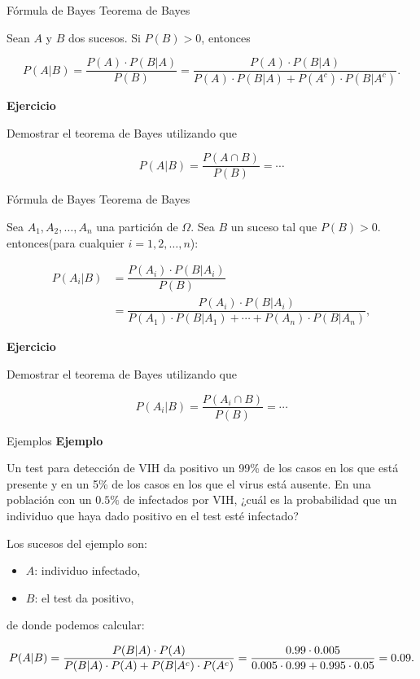 \documentclass[
  ignorenonframetext,
  aspectratio=169]{beamer}
\providecommand{\tightlist}{%
  \setlength{\itemsep}{0pt}\setlength{\parskip}{0pt}}\usepackage{longtable,booktabs,array}
\begin{document}
\begin{frame}{Fórmula de Bayes}
\label{fuxf3rmula-de-bayes}
Teorema de Bayes

Sean \(A\) y \(B\) dos sucesos. Si \(P(B)>0\), entonces

\[
P(A|B) =\dfrac{P(A)\cdot P(B|A)}{P(B)}=\dfrac{P(A)\cdot P(B|A)}{P(A)\cdot P(B|A)+P(A^c)\cdot P(B|A^c)}.
\]

\textbf{Ejercicio}

Demostrar el teorema de Bayes utilizando que

\[P(A|B) =\dfrac{P(A\cap B)}{P(B)}=\cdots\]
\end{frame}

\begin{frame}{Fórmula de Bayes}
\label{fuxf3rmula-de-bayes-1}
Teorema de Bayes

Sea \(A_1,A_2,\ldots,A_n\) una partición de \(\Omega\). Sea \(B\) un
suceso tal que \(P(B)>0\). entonces(para cualquier \(i=1,2,\ldots,n\)):

\[
\begin{array}{rl}
P(A_i|B) & =\dfrac{P(A_i)\cdot P(B|A_i)}{P(B)}\\
& =\dfrac{P(A_i)\cdot P(B|A_i)}{P(A_1)\cdot P(B|A_1)+\cdots+P(A_n)\cdot P(B|A_n)},
\end{array}
\]

\textbf{Ejercicio}

Demostrar el teorema de Bayes utilizando que

\[P(A_i|B) =\dfrac{P(A_i\cap B)}{P(B)}=\cdots\]
\end{frame}

\begin{frame}{Ejemplos}
\label{ejemplos-5}
\textbf{Ejemplo}

Un test para detección de VIH da positivo un 99\% de los casos en los
que está presente y en un 5\% de los casos en los que el virus está
ausente. En una población con un \(0.5\%\) de infectados por VIH, ¿cuál
es la probabilidad que un individuo que haya dado positivo en el test
esté infectado?

Los sucesos del ejemplo son:

\begin{itemize}
\tightlist
\item
  \(A\): individuo infectado,
\item
  \(B\): el test da positivo,
\end{itemize}

de donde podemos calcular:

\[\scriptsize{
P(A|B) =\dfrac{P(B|A)\cdot P(A)}{P(B|A)\cdot P(A)+P(B|A^c)\cdot P(A^c)}=\dfrac{0.99\cdot 0.005}{0.005\cdot 0.99+0.995\cdot 0.05}=0.09.}
\]
\end{frame}
\end{document}
